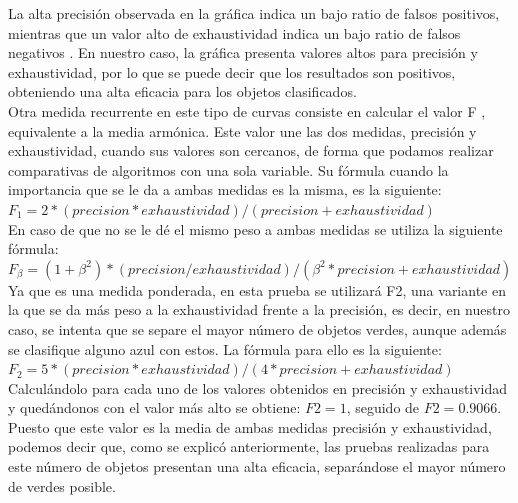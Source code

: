 \noindent La alta precisión observada en la gráfica indica un bajo ratio de falsos positivos, mientras que un valor alto de exhaustividad indica un bajo ratio de falsos negativos \cite{scikit-learn}. En nuestro caso, la gráfica presenta valores altos para precisión y exhaustividad, por lo que se puede decir que los resultados son positivos, obteniendo una alta eficacia para los objetos clasificados. \\

\noindent Otra medida recurrente en este tipo de curvas consiste en calcular el valor F \cite{powers2011evaluation}, equivalente a la media armónica. Este valor une las dos medidas, precisión y exhaustividad, cuando sus valores son cercanos, de forma que podamos realizar comparativas de algoritmos con una sola variable. Su fórmula cuando la importancia que se le da a ambas medidas es la misma, es la siguiente: \\

$ F_{1} = 2 * (precision * exhaustividad)/(precision + exhaustividad) $ \\

\noindent En caso de que no se le dé el mismo peso a ambas medidas se utiliza la siguiente fórmula: \\

$ F_{\beta} = (1 + \beta^{2}) * (precision/exhaustividad) / (\beta^{2} * precision + exhaustividad)$ \\

\noindent Ya que es una medida ponderada, en esta prueba se utilizará F2, una variante en la que se da más peso a la exhaustividad frente a la precisión, es decir, en nuestro caso, se intenta que se separe el mayor número de objetos verdes, aunque además se clasifique alguno azul con estos. La fórmula para ello es la siguiente: \\

$ F_{2} = 5 * (precision * exhaustividad)/(4* precision + exhaustividad) $ \\

\noindent Calculándolo para cada uno de los valores obtenidos en precisión y exhaustividad y quedándonos con el valor más alto se obtiene: $ F2 = 1 $, seguido de $ F2 = 0.9066 $.\\ 

\noindent Puesto que este valor es la media de ambas medidas precisión y exhaustividad, podemos decir que, como se explicó anteriormente, las pruebas realizadas para este número de objetos presentan una alta eficacia, separándose el mayor número de verdes posible. \\

